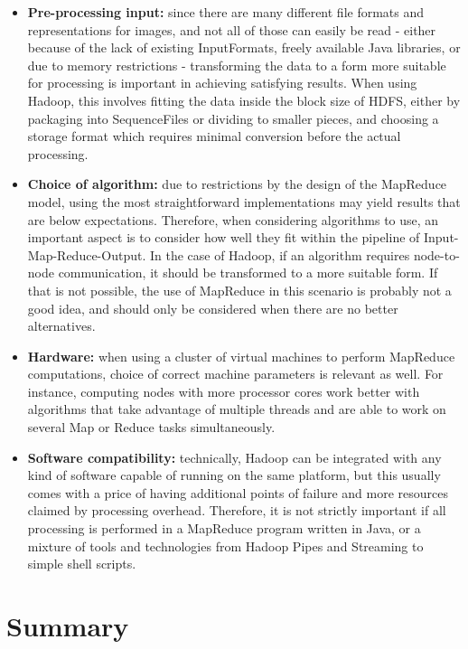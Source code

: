 \documentclass [12pt,a4paper]{report}
\begin{document}
\begin{itemize}
\item \textbf{Pre-processing input:} since there are many different file formats and representations for images, and not all of those can easily be read - either because of the lack of existing InputFormats, freely available Java libraries, or due to memory restrictions - transforming the data to a form more suitable for processing is important in achieving satisfying results. When using Hadoop, this involves fitting the data inside the block size of HDFS, either by packaging into SequenceFiles or dividing to smaller pieces, and choosing a storage format which requires minimal conversion before the actual processing. 
\item \textbf{Choice of algorithm:} due to restrictions by the design of the MapReduce model, using the most straightforward implementations may yield results that are below expectations. Therefore, when considering algorithms to use, an important aspect is to consider how well they fit within the pipeline of Input-Map-Reduce-Output. In the case of Hadoop, if an algorithm requires node-to-node communication, it should be transformed to a more suitable form. If that is not possible, the use of MapReduce in this scenario is probably not a good idea, and should only be considered when there are no better alternatives.  
\item \textbf{Hardware:} when using a cluster of virtual machines to perform MapReduce computations, choice of correct machine parameters is relevant as well. For instance, computing nodes with more processor cores work better with algorithms that take advantage of multiple threads and are able to work on several Map or Reduce tasks simultaneously.
\item \textbf{Software compatibility:} technically, Hadoop can be integrated with any kind of software capable of running on the same platform, but this usually comes with a price of having additional points of failure and more resources claimed by processing overhead. Therefore, it is not strictly important if all processing is performed in a MapReduce program written in Java, or a mixture of tools and technologies from Hadoop Pipes and Streaming to simple shell scripts.
\end{itemize}

\section{Summary}
\end{document}

